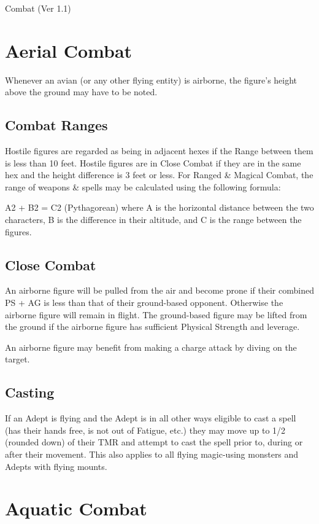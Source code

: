 \begin{Chapter}{Combat (Ver 1.1)}
\section{Aerial Combat}
\label{combat:aerial}

Whenever an avian (or any other flying entity) is airborne, the
figure’s height above the ground may have to be noted.

\subsection{Combat Ranges}

Hostile figures are regarded as being in adjacent hexes if the Range
between them is less than 10 feet. Hostile figures are in Close Combat
if they are in the same hex and the height difference is 3 feet or
less.  For Ranged \& Magical Combat, the range of weapons \& spells
may be calculated using the following formula:

A2 + B2 = C2 (Pythagorean) where A is the horizontal distance between
the two characters, B is the difference in their altitude, and C is
the range between the figures.

\subsection{Close Combat}

An airborne figure will be pulled from the air and become prone if
their combined PS + AG is less than that of their ground-based
opponent.  Otherwise the airborne figure will remain in flight.  The
ground-based figure may be lifted from the ground if the airborne
figure has sufficient Physical Strength and leverage.

An airborne figure may benefit from making a charge attack by diving
on the target.

\subsection{Casting}

If an Adept is flying and the Adept is in all other ways eligible to
cast a spell (has their hands free, is not out of Fatigue, etc.)  they
may move up to 1/2 (rounded down) of their TMR and attempt to cast the
spell prior to, during or after their movement.  This also applies to
all flying magic-using monsters and Adepts with flying mounts.

\section{Aquatic Combat}
\label{combat:aquatic}


\end{Chapter}
